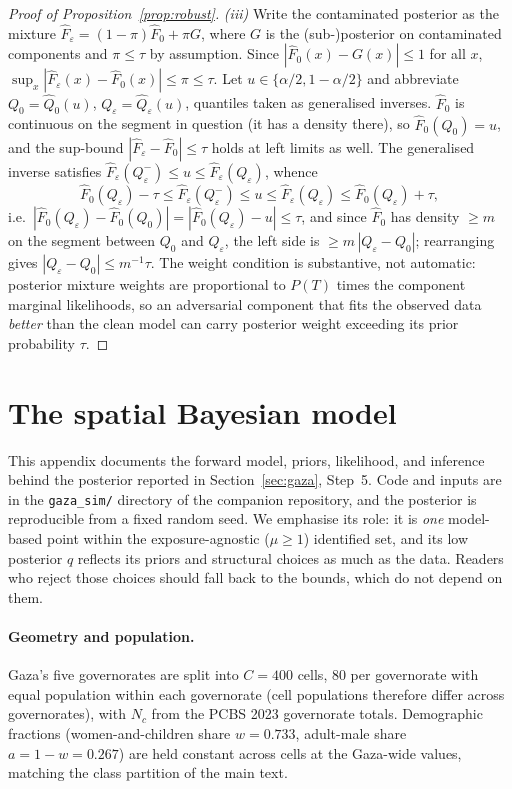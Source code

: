 \begin{proof}[Proof of Proposition~\ref{prop:robust}]
\emph{(iii)} Write the contaminated posterior as the mixture $\hat F_\varepsilon=(1-\pi)\hat F_0+\pi G$, where $G$ is the (sub-)posterior on contaminated components and $\pi\le\tau$ by assumption. Since $|\hat F_0(x)-G(x)|\le 1$ for all $x$, $\sup_x|\hat F_\varepsilon(x)-\hat F_0(x)|\le\pi\le\tau$. Let $u\in\{\alpha/2,1-\alpha/2\}$ and abbreviate $Q_0=\hat Q_0(u)$, $Q_\varepsilon=\hat Q_\varepsilon(u)$, quantiles taken as generalised inverses. $\hat F_0$ is continuous on the segment in question (it has a density there), so $\hat F_0(Q_0)=u$, and the sup-bound $|\hat F_\varepsilon-\hat F_0|\le\tau$ holds at left limits as well. The generalised inverse satisfies $\hat F_\varepsilon(Q_\varepsilon^-)\le u\le\hat F_\varepsilon(Q_\varepsilon)$, whence
\[
\hat F_0(Q_\varepsilon)-\tau\le\hat F_\varepsilon(Q_\varepsilon^-)\le u
\le\hat F_\varepsilon(Q_\varepsilon)\le\hat F_0(Q_\varepsilon)+\tau,
\]
i.e.\ $|\hat F_0(Q_\varepsilon)-\hat F_0(Q_0)|=|\hat F_0(Q_\varepsilon)-u|\le\tau$,
and since $\hat F_0$ has density $\ge m$ on the segment between $Q_0$ and $Q_\varepsilon$, the left side is $\ge m\,|Q_\varepsilon-Q_0|$; rearranging gives $|Q_\varepsilon-Q_0|\le m^{-1}\tau$. The weight condition is substantive, not automatic: posterior mixture weights are proportional to $P(T)$ times the component marginal likelihoods, so an adversarial component that fits the observed data \emph{better} than the clean model can carry posterior weight exceeding its prior probability $\tau$.
\end{proof}

\section{The spatial Bayesian model}\label{app:spatial}

This appendix documents the forward model, priors, likelihood, and inference behind the posterior reported in Section~\ref{sec:gaza}, Step~5. Code and inputs are in the \texttt{gaza\_sim/} directory of the companion repository, and the posterior is reproducible from a fixed random seed. We emphasise its role: it is \emph{one} model-based point within the exposure-agnostic ($\mu\ge 1$) identified set, and its low posterior $q$ reflects its priors and structural choices as much as the data. Readers who reject those choices should fall back to the bounds, which do not depend on them.

\paragraph{Geometry and population.} Gaza's five governorates are split into $C=400$ cells, 80 per governorate with equal population within each governorate (cell populations therefore differ across governorates), with $N_c$ from the PCBS 2023 governorate totals. Demographic fractions (women-and-children share $w=0.733$, adult-male share $a=1-w=0.267$) are held constant across cells at the Gaza-wide values, matching the class partition of the main text.

